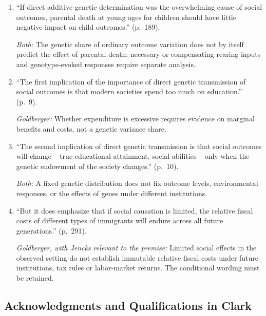 \begin{enumerate}[label=\arabic*.]
\emph{Jencks:} An effect of the child's own genotype can operate through parental responses to the child. It need not be independent of parent-child interaction, and is distinct from an effect of parental genotype holding the child's genotype fixed.

\item ``If direct additive genetic determination was the overwhelming cause of social outcomes, parental death at young ages for children should have little negative impact on child outcomes.'' (p.~189).

\emph{Both:} The genetic share of ordinary outcome variation does not by itself predict the effect of parental death; necessary or compensating rearing inputs and genotype-evoked responses require separate analysis.

\item ``The first implication of the importance of direct genetic transmission of social outcomes is that modern societies spend too much on education.'' (p.~9).

\emph{Goldberger:} Whether expenditure is excessive requires evidence on marginal benefits and costs, not a genetic variance share.

\item ``The second implication of direct genetic transmission is that social outcomes will change -- true educational attainment, social abilities -- only when the genetic endowment of the society changes.'' (p.~10).

\emph{Both:} A fixed genetic distribution does not fix outcome levels, environmental responses, or the effects of genes under different institutions.

\item ``But it does emphasize that if social causation is limited, the relative fiscal costs of different types of immigrants will endure across all future generations.'' (p.~291).

\emph{Goldberger, with Jencks relevant to the premise:} Limited social effects in the observed setting do not establish immutable relative fiscal costs under future institutions, tax rules or labor-market returns. The conditional wording must be retained.

\end{enumerate}

\subsection{Acknowledgments and Qualifications in Clark}

